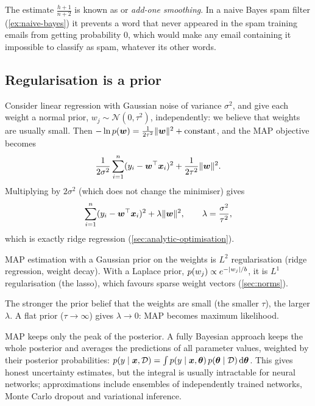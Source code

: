 The estimate $\frac{h + 1}{n + 2}$ is known as  or
\emph{add-one smoothing}. In a naive Bayes spam filter (\cref{ex:naive-bayes}) it
prevents a word that never appeared in the spam training emails from getting
probability $0$, which would make any email containing it impossible to classify
as spam, whatever its other words.

\subsection{Regularisation is a prior}

Consider linear regression with Gaussian noise of variance $\sigma^2$, and give
each weight a normal prior, $w_j \sim \mathcal{N}(0, \tau^2)$, independently:
we believe that weights are usually small. Then
$-\ln p(\bm{w}) = \frac{1}{2\tau^2}\lVert\bm{w}\rVert^2 + \text{constant}$, and the MAP
objective becomes
\[
  \frac{1}{2\sigma^2}\sum_{i=1}^n(y_i - \bm{w}^\top\bm{x}_i)^2
  + \frac{1}{2\tau^2}\lVert\bm{w}\rVert^2 .
\]
Multiplying by $2\sigma^2$ (which does not change the minimiser) gives
\[
  \sum_{i=1}^n(y_i - \bm{w}^\top\bm{x}_i)^2 + \lambda\lVert\bm{w}\rVert^2,
  \qquad \lambda = \frac{\sigma^2}{\tau^2} ,
\]
which is exactly ridge regression (\cref{sec:analytic-optimisation}).

\begin{theorem}\label{thm:priors-penalties}
MAP estimation with a Gaussian prior on the weights is $L^2$ regularisation
(ridge regression, weight decay). With a Laplace prior,
$p(w_j) \propto e^{-\lvert w_j\rvert/b}$, it is $L^1$ regularisation (the lasso), which
favours sparse weight vectors (\cref{sec:norms}).
\end{theorem}

The stronger the prior belief that the weights are small (the smaller $\tau$),
the larger $\lambda$. A flat prior ($\tau \to \infty$) gives $\lambda \to 0$: MAP
becomes maximum likelihood.

\begin{remark}
MAP keeps only the peak of the posterior. A fully Bayesian approach keeps the
whole posterior and averages the predictions of all parameter values, weighted
by their posterior probabilities:
$p(y \mid \bm{x}, \mathcal{D}) = \int p(y \mid \bm{x}, \bm{\theta})\,p(\bm{\theta} \mid
\mathcal{D})\,\mathrm{d}\bm{\theta}$. This gives honest uncertainty estimates, but the
integral is usually intractable for neural networks; approximations include
ensembles of independently trained networks, Monte Carlo dropout and
variational inference.
\end{remark}

